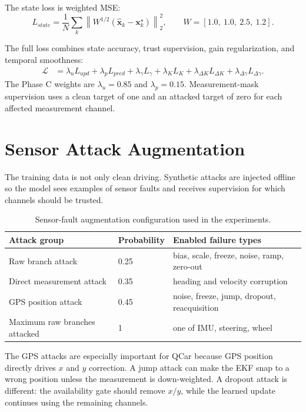 \documentclass[11pt,a4paper]{article}
\newcommand{\state}{\bm{x}}
\begin{document}
The state loss is weighted MSE:
\begin{equation}
  L_{state}
  =
  \frac{1}{N}\sum_k
  \left\|
  W^{1/2}(\hat{\state}_k-\state_k^\star)
  \right\|_2^2,
  \qquad
  W=[1.0,\ 1.0,\ 2.5,\ 1.2].
\end{equation}

The full loss combines state accuracy, trust supervision, gain regularization,
and temporal smoothness:
\begin{equation}
\begin{aligned}
  \mathcal{L}
  &=
  \lambda_u L_{upd}
  + \lambda_p L_{pred}
  + \lambda_{\gamma} L_{\gamma}
  + \lambda_K L_K
  + \lambda_{\Delta K} L_{\Delta K}
  + \lambda_{\Delta\gamma} L_{\Delta\gamma}.
\end{aligned}
\end{equation}
The Phase C weights are $\lambda_u=0.85$ and $\lambda_p=0.15$.
Measurement-mask supervision uses a clean target of one and an attacked target
of zero for each affected measurement channel.

\section{Sensor Attack Augmentation}

The training data is not only clean driving. Synthetic attacks are injected
offline so the model sees examples of sensor faults and receives supervision
for which channels should be trusted.

\begin{table}[htbp]
\centering
\caption{Sensor-fault augmentation configuration used in the experiments.}
\label{tab:augmentation}
\begin{tabular}{lll}
\toprule
Attack group & Probability & Enabled failure types \\
\midrule
Raw branch attack & 0.25 & bias, scale, freeze, noise, ramp, zero-out \\
Direct measurement attack & 0.35 & heading and velocity corruption \\
GPS position attack & 0.45 & noise, freeze, jump, dropout, reacquisition \\
Maximum raw branches attacked & 1 & one of IMU, steering, wheel \\
\bottomrule
\end{tabular}
\end{table}

The GPS attacks are especially important for QCar because GPS position directly
drives $x$ and $y$ correction. A jump attack can make the EKF snap to a wrong
position unless the measurement is down-weighted. A dropout attack is different:
the availability gate should remove $x/y$, while the learned update continues
using the remaining channels.
\end{document}
